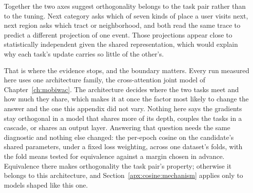 
Together the two axes suggest orthogonality belongs to the task pair rather than to the tuning. Next
category asks which of seven kinds of place a user visits next, next region asks which tract or
neighborhood, and both read the same trace to predict a different projection of one event. Those
projections appear close to statistically independent given the shared representation, which would
explain why each task's update carries so little of the other's.

That is where the evidence stops, and the boundary matters. Every run measured here uses one
architecture family, the cross-attention joint model of Chapter~\ref{ch:mobiwac}. The architecture
decides where the two tasks meet and how much they share, which makes it at once the factor most
likely to change the answer and the one this appendix did not vary. Nothing here says the gradients
stay orthogonal in a model that shares more of its depth, couples the tasks in a cascade, or shares
an output layer. %
Answering that question needs the same diagnostic and nothing else changed: the per-epoch
cosine on the candidate's shared parameters, under a fixed loss weighting, across one dataset's
folds, with the fold means tested for equivalence against a margin chosen in advance. Equivalence
there makes orthogonality the task pair's property; otherwise it belongs to this architecture, and
Section~\ref{apx:cosine:mechanism} applies only to models shaped like this one.

